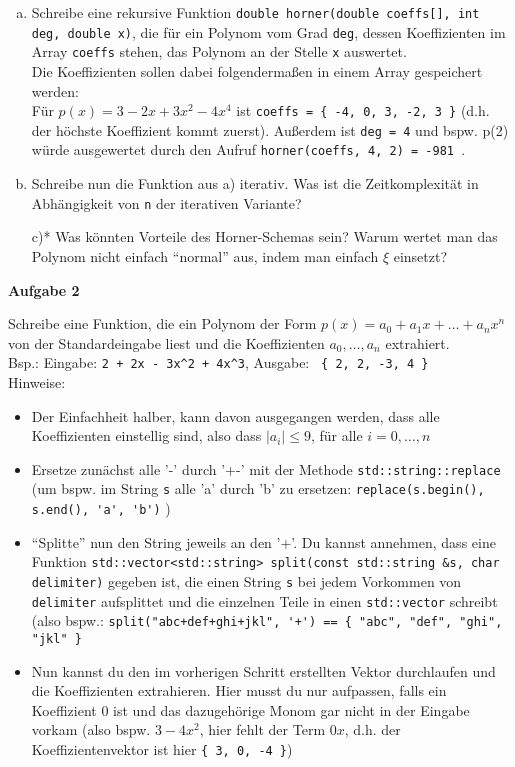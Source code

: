 \documentclass[a4paper,12pt]{article}
\newcommand{\Aufgabe}[1]{
  {
    \vspace*{0.5cm}
    \textsf{\textbf{Aufgabe #1}}
    \vspace*{0.2cm}
    
  }
}
\begin{document}
\begin{enumerate}[a)\ ]
\item
  Schreibe eine rekursive Funktion \lstinline{double horner(double coeffs[], int deg, double x)}, die für ein Polynom vom Grad \lstinline{deg}, dessen Koeffizienten im Array \lstinline{coeffs} stehen, das Polynom an der Stelle \lstinline{x} auswertet. \\
  Die Koeffizienten sollen dabei folgendermaßen in einem Array gespeichert werden: \\
  Für $p(x) = 3 - 2x + 3x^2 - 4x^4$ ist \lstinline|coeffs = { -4, 0, 3, -2, 3 }| (d.h. der höchste Koeffizient kommt zuerst). Außerdem ist  \lstinline{deg = 4} und bspw. p(2) würde ausgewertet durch den Aufruf \lstinline{horner(coeffs, 4, 2) = -981 }.
  
\item Schreibe nun die Funktion aus a) iterativ. Was ist die Zeitkomplexität in Abhängigkeit von \texttt{n} der iterativen Variante?
\item[c)*] Was könnten Vorteile des Horner-Schemas sein? Warum wertet man das Polynom nicht einfach ``normal'' aus, indem man einfach $\xi$ einsetzt?
\end{enumerate}

\Aufgabe{2} Schreibe eine Funktion, die ein Polynom der Form
$p(x) = a_0 + a_1 x + \dots + a_nx^n$ von der Standardeingabe liest
und die Koeffizienten $a_0, \dots, a_n$ extrahiert. \\
Bsp.: Eingabe: \texttt{2 + 2x - 3x\textasciicircum 2 + 4x\textasciicircum 3}, Ausgabe: \texttt{ \{ 2, 2, -3, 4 \} } \\
Hinweise:
\begin{itemize}
\item Der Einfachheit halber, kann davon ausgegangen werden, dass alle Koeffizienten einstellig sind,
  also dass $|a_i| \le 9$, für alle $i=0,\dots,n$
\item Ersetze zunächst alle '-' durch '+-' mit der Methode
  \lstinline{std::string::replace} (um bspw. im String \lstinline{s} alle
  'a' durch 'b' zu ersetzen: \lstinline{replace(s.begin(), s.end(), 'a', 'b')} )
\item ``Splitte'' nun den String jeweils an den '+'. Du kannst
  annehmen, dass eine Funktion \lstinline{std::vector<std::string> split(const std::string &s, char delimiter)} gegeben ist, die  einen String \lstinline{s} bei jedem Vorkommen von \lstinline{delimiter}
  aufsplittet und die einzelnen Teile in einen \lstinline{std::vector}
  schreibt (also bspw.: \lstinline|split("abc+def+ghi+jkl", '+') == { "abc", "def", "ghi", "jkl" }|
\item Nun kannst du den im vorherigen Schritt erstellten Vektor
  durchlaufen und die Koeffizienten extrahieren. Hier musst du nur
  aufpassen, falls ein Koeffizient 0 ist und das dazugehörige Monom
  gar nicht in der Eingabe vorkam (also bspw. $3 - 4x^2$, hier fehlt
  der Term $0x$, d.h. der Koeffizientenvektor ist hier \texttt{\{ 3, 0, -4 \}})
\end{itemize}
\end{document}
